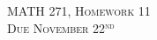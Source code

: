 \documentclass[12pt]{article} %
\begin{document}
\begin{center}
   \textsc{\large MATH 271, Homework 11}\\
   \textsc{Due November 22$^\textrm{nd}$}
\end{center}
\vspace{.5cm}

%
%
%
\end{document}
